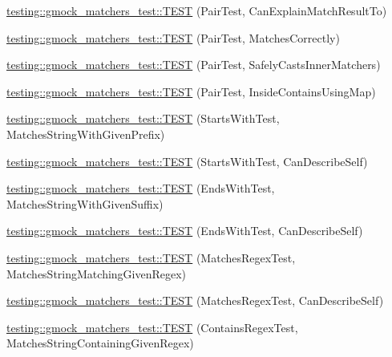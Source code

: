 \begin{DoxyCompactItemize}
\item 
\hyperlink{namespacetesting_1_1gmock__matchers__test_a4ee8f3967e3658cd7bd340558922f131}{testing\+::gmock\+\_\+matchers\+\_\+test\+::\+T\+E\+ST} (Pair\+Test, Can\+Explain\+Match\+Result\+To)
\item 
\hyperlink{namespacetesting_1_1gmock__matchers__test_acdb02e9ac603c91b35602751f6a81239}{testing\+::gmock\+\_\+matchers\+\_\+test\+::\+T\+E\+ST} (Pair\+Test, Matches\+Correctly)
\item 
\hyperlink{namespacetesting_1_1gmock__matchers__test_ad2110445fe8f2f8ca947540f2a400228}{testing\+::gmock\+\_\+matchers\+\_\+test\+::\+T\+E\+ST} (Pair\+Test, Safely\+Casts\+Inner\+Matchers)
\item 
\hyperlink{namespacetesting_1_1gmock__matchers__test_a9785412a9e786b1f81387204df577c73}{testing\+::gmock\+\_\+matchers\+\_\+test\+::\+T\+E\+ST} (Pair\+Test, Inside\+Contains\+Using\+Map)
\item 
\hyperlink{namespacetesting_1_1gmock__matchers__test_ac8a66c592ff57cce28b6f1d5211fd370}{testing\+::gmock\+\_\+matchers\+\_\+test\+::\+T\+E\+ST} (Starts\+With\+Test, Matches\+String\+With\+Given\+Prefix)
\item 
\hyperlink{namespacetesting_1_1gmock__matchers__test_a492143bbe0627c563c5d0c65bf3f4d5b}{testing\+::gmock\+\_\+matchers\+\_\+test\+::\+T\+E\+ST} (Starts\+With\+Test, Can\+Describe\+Self)
\item 
\hyperlink{namespacetesting_1_1gmock__matchers__test_ac3d41540d2ae7956d33c9eae1be67d91}{testing\+::gmock\+\_\+matchers\+\_\+test\+::\+T\+E\+ST} (Ends\+With\+Test, Matches\+String\+With\+Given\+Suffix)
\item 
\hyperlink{namespacetesting_1_1gmock__matchers__test_a80da065ed9f5fb87add88ae2bc14056d}{testing\+::gmock\+\_\+matchers\+\_\+test\+::\+T\+E\+ST} (Ends\+With\+Test, Can\+Describe\+Self)
\item 
\hyperlink{namespacetesting_1_1gmock__matchers__test_a5983e981b59498c6427ddb183c414bb7}{testing\+::gmock\+\_\+matchers\+\_\+test\+::\+T\+E\+ST} (Matches\+Regex\+Test, Matches\+String\+Matching\+Given\+Regex)
\item 
\hyperlink{namespacetesting_1_1gmock__matchers__test_acb4e75ec699fe1bc178e7ec32fb479c8}{testing\+::gmock\+\_\+matchers\+\_\+test\+::\+T\+E\+ST} (Matches\+Regex\+Test, Can\+Describe\+Self)
\item 
\hyperlink{namespacetesting_1_1gmock__matchers__test_a0a23f3ff8f97ccf74cd64673edc6694f}{testing\+::gmock\+\_\+matchers\+\_\+test\+::\+T\+E\+ST} (Contains\+Regex\+Test, Matches\+String\+Containing\+Given\+Regex)

\end{DoxyCompactItemize}
